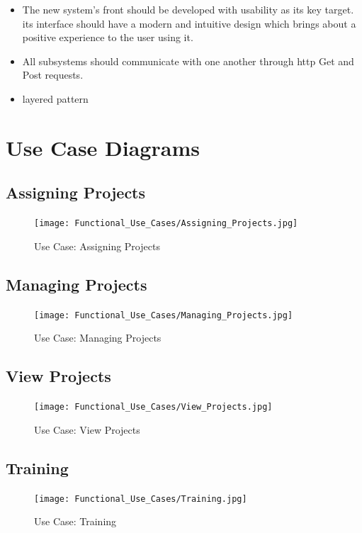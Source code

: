 \documentclass[a4paper,12pt]{article}
\begin{document}
	\begin{itemize}
		\item The new system's front should be developed with usability as its key target. its interface should have a modern and intuitive design which brings about a positive experience to the user using it.
		
		\item All subsystems should communicate with one another through http Get and Post requests.
	\end{itemize}
	
	\begin{itemize}
		\item layered pattern
	\end{itemize}
	
	\newpage
	\section{Use Case Diagrams}
	\subsection{Assigning Projects}
	\begin{figure}[h]
		\centering
		\texttt{[image: Functional\_Use\_Cases/Assigning\_Projects.jpg]}
		\caption{Use Case: Assigning Projects }
		\label{fig:UC1}
	\end{figure}
	\clearpage
	\subsection{Managing Projects}
	
	\begin{figure}[h]
		\centering
		\texttt{[image: Functional\_Use\_Cases/Managing\_Projects.jpg]}
		\caption{Use Case: Managing Projects}
		\label{fig:UC2}
	\end{figure}
	\clearpage
	
	\subsection{View Projects}
	\begin{figure}[h]
		\centering
		\texttt{[image: Functional\_Use\_Cases/View\_Projects.jpg]}
		\caption{Use Case: View Projects}
		\label{fig:UC3}
	\end{figure}
	\clearpage
	\newpage
	\subsection{Training}
	\begin{figure}[h]
		\centering
		\texttt{[image: Functional\_Use\_Cases/Training.jpg]}
		\caption{Use Case: Training}
		\label{fig:UC4}
	\end{figure}
	
\end{document}
